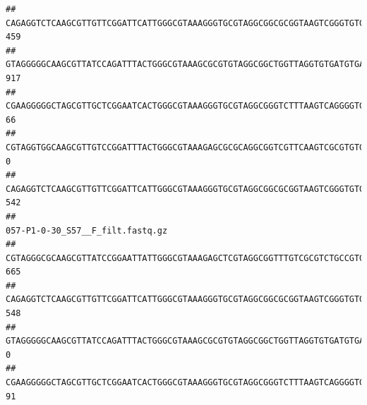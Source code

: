 \documentclass[]{article}
\begin{document}
\begin{verbatim}
## CAGAGGTCTCAAGCGTTGTTCGGATTCATTGGGCGTAAAGGGTGCGTAGGCGGCGCGGTAAGTCGGGTGTGAAATCTCGGAGCTTAACTCCGAAACTGCATTCGATACTGCCGTGCTTGAGGACTGGAGAGGAGACTGGAATTTACGGTGTAGCGGTGAAATGCGTAGATATCGTAAGGAAGACCAGTGGCGAAGGCGGGTCTCTGGACAGTTCCTGACGCTGAGGCACGAAGGCCAGGGGAGCAAACG                               459
## GTAGGGGGCAAGCGTTATCCAGATTTACTGGGCGTAAAGCGCGTGTAGGCGGCTGGTTAGGTGTGATGTGAAATCTTCCGGCTCAACCGGAAAACTGCATTGCAAACCGGCCTGGCTAGAGTGCAGGAGAGGGAAGCGGAATTCCAGGTGTAGCGGTGAAATGCGTAGATATCTGGAGGAACACCAGTGGCGAAGGCGGCTTCCTGGCCTGCAACTGACGCTGAGACGCGAAAGCGTGGGGAGCGAAC                                917
## CGAAGGGGGCTAGCGTTGCTCGGAATCACTGGGCGTAAAGGGTGCGTAGGCGGGTCTTTAAGTCAGGGGTGAAATCCTGGAGCTCAACTCCAGAACTGCCTTTGATACTGAAGATCTTGAGTTCGGGAGAGGTGAGTGGAACTGCGAGTGTAGAGGTGAAATTCGTAGATATTCGCAAGAACACCAGTGGCGAAGGCGGCTCACTGGCCCGATACTGACGCTGAGGCACGAAAGCGTGGGGAGCAAACA                                66
## CGTAGGTGGCAAGCGTTGTCCGGATTTACTGGGCGTAAAGAGCGCGCAGGCGGTCGTTCAAGTCGCGTGTGAAAGCCCCCGGCTCAACTGGGGAGGGTCACGCGATACTGATCGACTCGAAGGCAGGAGAGGGTAGTGGAATTCCCGGTGTAGTGGTGAAATGCGTAGATATCGGGAGGAACACCAGTGGCGAAGGCGACTACCTGGCCTGTTCTTGACGCTGAGGCGCGAAAGCTAGGGGAGCAAACG                                 0
## CAGAGGTCTCAAGCGTTGTTCGGATTCATTGGGCGTAAAGGGTGCGTAGGCGGCGCGGTAAGTCGGGTGTGAAATCTCGGGGCTTAACTCCGAAACTGCATTCGATACTGCCGTGCTTGAGGACTGGAGAGGAGACTGGAATTTACGGTGTAGCGGTGAAATGCGTAGATATCGTAAGGAAGACCAGTGGCGAAGGCGGGTCTCTGGACAGTTCCTGACGCTGAGGCACGAAGGCCAGGGGAGCAAACG                               542
##                                                                                                                                                                                                                                                           057-P1-0-30_S57__F_filt.fastq.gz
## CGTAGGGCGCAAGCGTTATCCGGAATTATTGGGCGTAAAGAGCTCGTAGGCGGTTTGTCGCGTCTGCCGTGAAAGTCCGGGGCTCAACTCCGGATCTGCGGTGGGTACGGGCAGACTAGAGTGATGTAGGGGAGACTGGAATTCCTGGTGTAGCGGTGAAATGCGCAGATATCAGGAGGAACACCGATGGCGAAGGCAGGTCTCTGGGCATTAACTGACGCTGAGGAGCGAAAGCATGGGGAGCGAACA                              665
## CAGAGGTCTCAAGCGTTGTTCGGATTCATTGGGCGTAAAGGGTGCGTAGGCGGCGCGGTAAGTCGGGTGTGAAATCTCGGAGCTTAACTCCGAAACTGCATTCGATACTGCCGTGCTTGAGGACTGGAGAGGAGACTGGAATTTACGGTGTAGCGGTGAAATGCGTAGATATCGTAAGGAAGACCAGTGGCGAAGGCGGGTCTCTGGACAGTTCCTGACGCTGAGGCACGAAGGCCAGGGGAGCAAACG                              548
## GTAGGGGGCAAGCGTTATCCAGATTTACTGGGCGTAAAGCGCGTGTAGGCGGCTGGTTAGGTGTGATGTGAAATCTTCCGGCTCAACCGGAAAACTGCATTGCAAACCGGCCTGGCTAGAGTGCAGGAGAGGGAAGCGGAATTCCAGGTGTAGCGGTGAAATGCGTAGATATCTGGAGGAACACCAGTGGCGAAGGCGGCTTCCTGGCCTGCAACTGACGCTGAGACGCGAAAGCGTGGGGAGCGAAC                                 0
## CGAAGGGGGCTAGCGTTGCTCGGAATCACTGGGCGTAAAGGGTGCGTAGGCGGGTCTTTAAGTCAGGGGTGAAATCCTGGAGCTCAACTCCAGAACTGCCTTTGATACTGAAGATCTTGAGTTCGGGAGAGGTGAGTGGAACTGCGAGTGTAGAGGTGAAATTCGTAGATATTCGCAAGAACACCAGTGGCGAAGGCGGCTCACTGGCCCGATACTGACGCTGAGGCACGAAAGCGTGGGGAGCAAACA                               91

\end{verbatim}
\end{document}
